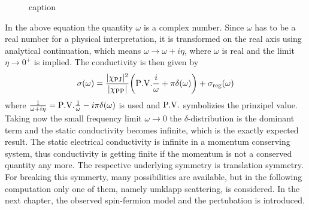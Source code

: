 %
\begin{figure}[t]
	\caption{caption}
	\label{fig:conductivity broken and unbroken translation symmetry}
\end{figure}
%
In the above equation the quantity $\omega$ is a complex number.
Since $\omega$ has to be a real number for a physical interpretation, it is transformed on the real axis using analytical continuation, which means $\omega \to \omega + i\eta$, where $\omega$ is real and the limit $\eta \to 0^{+}$ is implied.
The conductivity is then given by
%
\begin{align}
	\sigma(\omega) = \frac{\vert\chi_{\mt{PJ}}\vert^{2}}{\vert\chi_{\mt{PP}}\vert} \bigg(\PV{\frac{i}{\omega}} + \pi \delta(\omega) \bigg) + \sigma_{\mt{reg}}(\omega)
	\label{eq:conductivity unpertubed system}
\end{align}
%
where $\frac{1}{\omega + i\eta} = \PV{\frac{1}{\omega}} - i\pi\delta(\omega)$ is used and $\PV$ symbolizies the prinzipel value.
Taking now the small frequency limit $\omega \to 0$ the $\delta$-distribution is the dominant term and the static conductivity becomes infinite, which is the exactly expected result.
The static electrical conductivity is infinite in a momentum conserving system, thus conductivity is getting finite if the momentum is not a conserved quantity any more.
The respective underlying symmetry is translation symmetry.
For breaking this symmerty, many possibilities are available, but in the following computation only one of them, namely umklapp scattering, is considered.
In the next chapter, the observed spin-fermion model and the pertubation is introduced.
























